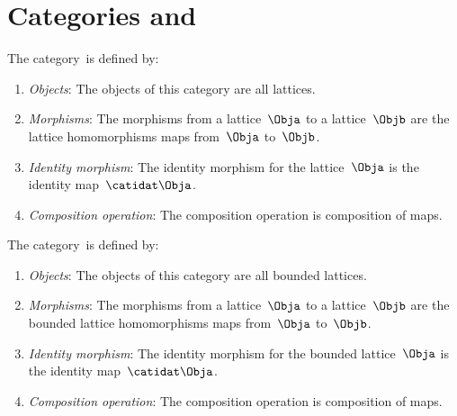 \section{Categories \Lat and \BoundedLat}
\begin{ctdefinition}
    \label{def:Lat}
    The category~\Lat is defined by:
    \begin{enumerate}
        \item \emph{Objects}: The objects of this category are all lattices.
        \item \emph{Morphisms}: The morphisms from a lattice~$\Obja$ to a lattice~$\Objb$ are the lattice homomorphisms maps from~$\Obja$ to~$\Objb$.
        \item \emph{Identity morphism}: The identity morphism for the lattice~$\Obja$
              is the identity map~$\catidat\Obja$.
        \item \emph{Composition operation}: The composition operation is composition of maps.
    \end{enumerate}
\end{ctdefinition}

\begin{ctdefinition}
    \label{def:BoundedLat}
    The category~\BoundedLat is defined by:
    \begin{enumerate}
        \item \emph{Objects}: The objects of this category are all bounded lattices.
        \item \emph{Morphisms}: The morphisms from a lattice~$\Obja$ to a lattice~$\Objb$ are the bounded lattice homomorphisms maps from~$\Obja$ to~$\Objb$.
        \item \emph{Identity morphism}: The identity morphism for the bounded lattice~$\Obja$
              is the identity map~$\catidat\Obja$.
        \item \emph{Composition operation}: The composition operation is composition of maps.
    \end{enumerate}
\end{ctdefinition}

